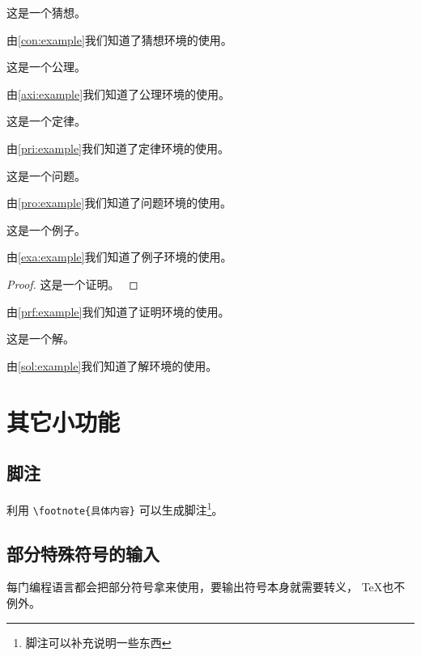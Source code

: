 \documentclass[withoutpreface,bwprint]{cumcmthesis} %
\begin{document}
\begin{conjecture}
    这是一个猜想。
    \label{con:example}
\end{conjecture}
由\cref{con:example}我们知道了猜想环境的使用。

\begin{axiom}
    这是一个公理。
    \label{axi:example}
\end{axiom}
由\cref{axi:example}我们知道了公理环境的使用。

\begin{principle}
    这是一个定律。
    \label{pri:example}
\end{principle}
由\cref{pri:example}我们知道了定律环境的使用。

\begin{problem}
    这是一个问题。
    \label{pro:example}
\end{problem}
由\cref{pro:example}我们知道了问题环境的使用。

\begin{example}
    这是一个例子。
    \label{exa:example}
\end{example}
由\cref{exa:example}我们知道了例子环境的使用。

\begin{proof}
    这是一个证明。
    \label{prf:example}
\end{proof}
由\cref{prf:example}我们知道了证明环境的使用。

\begin{solution}
    这是一个解。
    \label{sol:example}
\end{solution}
由\cref{sol:example}我们知道了解环境的使用。



\section{其它小功能}
\subsection{脚注}

利用 \verb|\footnote{具体内容}| 可以生成脚注\footnote{脚注可以补充说明一些东西}。

\subsection{部分特殊符号的输入}

每门编程语言都会把部分符号拿来使用，要输出符号本身就需要转义， \TeX{}也不例外。
\end{document}
